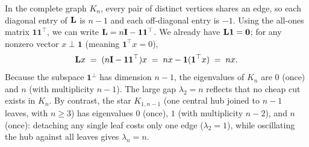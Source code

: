 \begin{example}\label{ch31:ex-kn-star}
In the complete graph $K_n$, every pair of distinct vertices shares an edge, so each diagonal entry of $\mathbf{L}$ is $n-1$ and each off-diagonal entry is $-1$. Using the all-ones matrix $\mathbf{1}\mathbf{1}^\top$, we can write $\mathbf{L} = n\mathbf{I} - \mathbf{1}\mathbf{1}^\top$. We already have $\mathbf{L}\mathbf{1} = \mathbf{0}$; for any nonzero vector $x \perp \mathbf{1}$ (meaning $\mathbf{1}^\top x = 0$),
\[
  \mathbf{L} x \;=\; (n\mathbf{I} - \mathbf{1}\mathbf{1}^\top)x \;=\; nx - \mathbf{1}(\mathbf{1}^\top x) \;=\; nx .
\]
Because the subspace $\mathbf{1}^\perp$ has dimension $n-1$, the eigenvalues of $K_n$ are $0$ (once) and $n$ (with multiplicity $n-1$). The large gap $\lambda_2 = n$ reflects that no cheap cut exists in $K_n$. By contrast, the star $K_{1,n-1}$ (one central hub joined to $n-1$ leaves, with $n\ge 3$) has eigenvalues $0$ (once), $1$ (with multiplicity $n-2$), and $n$ (once): detaching any single leaf costs only one edge ($\lambda_2 = 1$), while oscillating the hub against all leaves gives $\lambda_n = n$.
\end{example}

